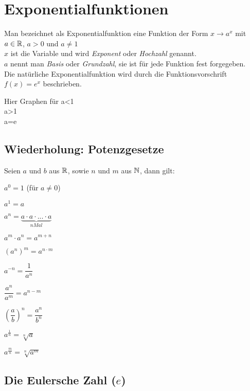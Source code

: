 \chapter{Exponentialfunktionen}

\begin{Definition}
Man bezeichnet als Exponentialfunktion eine Funktion der Form $x\rightarrow a^x$ mit $a\in \mathbb{R}$, $a>0$ und $a\neq1$\\
$x$ ist die Variable und wird \textit{Exponent} oder \textit{Hochzahl} genannt.\\
$a$ nennt man \textit{Basis} oder \textit{Grundzahl}, sie ist für jede Funktion fest forgegeben.\\
Die natürliche Exponentialfunktion wird durch die Funktionsvorschrift $f(x)=e^x$ beschrieben.
\end{Definition}

Hier Graphen für a<1\\
a>1\\
a=e\\


		\section{Wiederholung: Potenzgesetze}
Seien $a$ und $b$ aus $\mathbb{R}$, sowie $n$ und $m$ aus $\mathbb{N}$, dann gilt:
\begin{enumerate}
\begin{minipage}{0.5\textwidth}
\item$a^0=1$ (für $a\neq 0$)
\item$a^1=a$
\item$a^n=\underbrace{a\cdot a\cdot ... \cdot a}_{n Mal}$
\item$a^m\cdot a^n=a^{m+n}$
\item$(a^n)^m=a^{n\cdot m}$
\end {minipage}
\begin{minipage}{0.5\textwidth}
\item$a^{-n}=\dfrac{1}{a^n}$
\item$\dfrac{a^n}{a^m}=a^{n-m}$
\item$\left(\dfrac{a}{b}\right)^n=\dfrac{a^n}{b^n}$
\item $a^{\frac{1}{n}}=\sqrt[n]{a}$
\item$a^{\frac{m}{n}}=\sqrt[n]{a^m}$
\end {minipage}
\end{enumerate}

		\section{Die Eulersche Zahl ($e$)}

